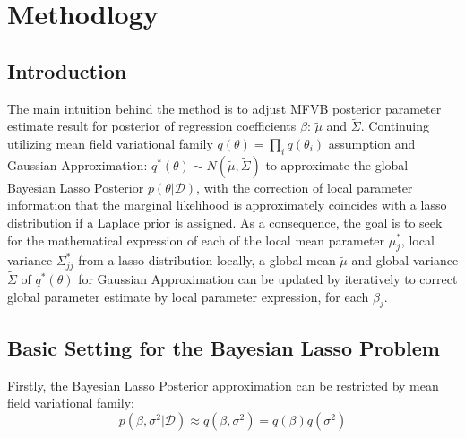 \chapter{Methodlogy}
\label{Chapter3}
\section{Introduction}
The main intuition behind the method is to adjust MFVB posterior parameter estimate result for posterior of regression coefficients $\beta$: $\tilde{\mu}$ and $\tilde{\Sigma}$. Continuing utilizing mean field variational family $q(\theta) = \prod_i q(\theta_i)$ assumption and Gaussian Approximation: $q^*(\theta) \sim N(\tilde{\mu},\tilde{\Sigma})$  to approximate the global Bayesian Lasso Posterior $p(\theta|\mathcal{D})$, with the correction of local parameter information that the marginal likelihood is approximately coincides with a lasso distribution if a Laplace prior is assigned. As a consequence, the goal is to seek for the mathematical expression of each of the local mean parameter $\mu_j^{*}$, local variance $\Sigma_{jj}^{*}$ from a lasso distribution locally, a global mean $\tilde{\mu}$ and global variance $\tilde{\Sigma}$ of $q^*(\theta)$ for Gaussian Approximation can be updated by iteratively to correct global parameter estimate by local parameter expression, for each $\beta_j$.


\section{Basic Setting for the Bayesian Lasso Problem}
Firstly, the Bayesian Lasso Posterior approximation can be restricted by mean field variational family:
\begin{equation}
	\label{eq:assum}
	p(\beta,\sigma^2|\mathcal{D})\approx q(\beta,\sigma^2) = q(\beta)q(\sigma^2)
\end{equation}

